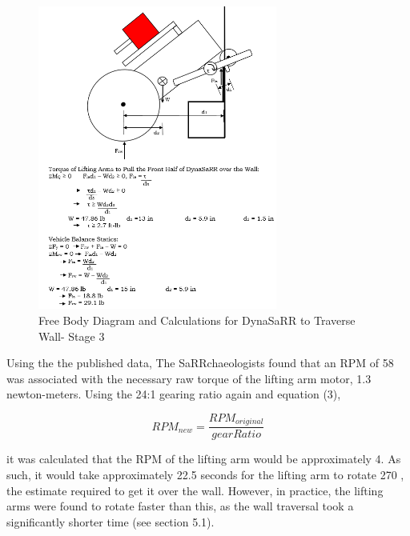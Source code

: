 \label{fig:analysis5_wall3}
\begin{figure}[hp]
    \centering
    \includegraphics[width=0.7\textwidth]{Images/analysis5_wall3.png}
    \caption{Free Body Diagram and Calculations for DynaSaRR to Traverse Wall- Stage 3}
    \label{fig:analysis5_wall3}
\end{figure}
\vfill
\newpage

Using the the published data, The SaRRchaeologists found that an RPM of 58 was associated with the necessary raw torque of the lifting arm motor, 1.3 newton-meters. Using the 24:1 gearing ratio again and equation (3),

\begin{equation}
    RPM_{new} = \frac{RPM_{original}}{gearRatio} 
\end{equation}


it was calculated that the RPM of the lifting arm would be approximately 4. As such, it would take approximately 22.5 seconds for the lifting arm to rotate 270 \degrees, the estimate required to get it over the wall. However, in practice, the lifting arms were found to rotate faster than this, as the wall traversal took a significantly shorter time (see section 5.1).

